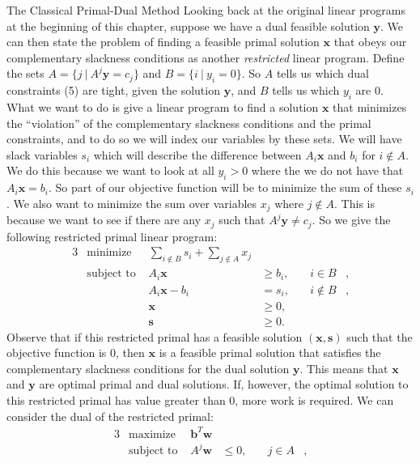 \begin{section}{The Classical Primal-Dual Method}
	Looking back at the original linear programs at the beginning of this chapter, suppose we have 
	a dual feasible solution $\mathbf{y}$. We can then state the problem of finding a feasible 
	primal solution $\mathbf{x}$ that obeys our complementary slackness conditions as another 
	\emph{restricted} linear program. Define the sets $A = \{j\ |\ A^{j}\mathbf{y} = c_j\}$ and 
	$B = \{i\ |\ y_i = 0\}$. So $A$ tells us which dual constraints (5) are tight, 
	given the solution $\mathbf{y}$, and $B$ tells us which $y_i$ are 0. What we want to do is 
	give a linear program to find a solution $\mathbf{x}$ that minimizes the 
	``violation'' of the complementary slackness conditions and the primal constraints, and to do 
	so we will index our variables by these sets. We will 
	have slack variables $s_i$ which will describe the difference between $A_i\mathbf{x}$ and $b_i$ 
	for $i\notin A$. We do this because we want to look at all $y_i > 0$ where the we do not 
	have that $A_i\mathbf{x} = b_i$. So part of our objective function will be to minimize the 
	sum of these $s_i$. We also want to minimize the sum over variables $x_j$ where $j\notin A$. 
	This is because we want to see if there are any $x_j$ such that $A^{j}\mathbf{y} \neq c_j$. 
	So we give the following restricted primal linear program:
	\begin{alignat}{3}
		& \text{minimize } & \sum_{i\notin B} s_i + \sum_{j\notin A} x_j & \\
		& \text{subject to } & A_i\mathbf{x} & \geq b_i, & \quad i\in B &, \\
				     && A_i\mathbf{x} - b_i & = s_i, & \quad i\notin B &, \\
				     && \mathbf{x} & \geq 0, \\
				     && \mathbf{s} & \geq 0.
	\end{alignat}
	Observe that if this restricted primal has a feasible solution $(\mathbf{x},\mathbf{s})$ such 
	that the objective function is 0, then $\mathbf{x}$ is a feasible primal solution that 
	satisfies the complementary slackness conditions for the dual solution $\mathbf{y}$. This 
	means that $\mathbf{x}$ and $\mathbf{y}$ are optimal primal and dual solutions. If, however, 
	the optimal solution to this restricted primal has value greater than 0, more work is required. 
	We can consider the dual of the restricted primal:
	\begin{alignat}{3}
		& \text{maximize } & \mathbf{b}^{T}\mathbf{w} & \\
		& \text{subject to } & A^{j}\mathbf{w} & \leq 0, & \quad j\in A &, \\

\end{alignat}
\end{section}
